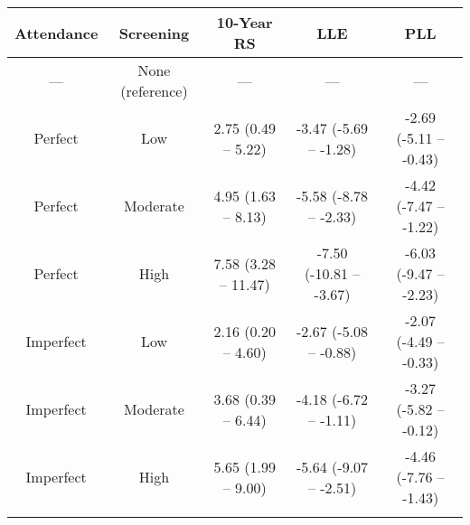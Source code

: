 \begin{tabular}{ccccc}
\toprule{}
Attendance & Screening &  10-Year RS & LLE & PLL \\
\midrule{}
 --- & None (reference) & --- & --- & --- \\
Perfect & Low &  2.75 (0.49 -- 5.22) & -3.47 (-5.69 -- -1.28) & -2.69 (-5.11 -- -0.43)  \\
Perfect & Moderate &  4.95 (1.63 -- 8.13) & -5.58 (-8.78 -- -2.33) & -4.42 (-7.47 -- -1.22)  \\
Perfect & High &  7.58 (3.28 -- 11.47) & -7.50 (-10.81 -- -3.67) & -6.03 (-9.47 -- -2.23)  \\
Imperfect & Low &  2.16 (0.20 -- 4.60) & -2.67 (-5.08 -- -0.88) & -2.07 (-4.49 -- -0.33)  \\
Imperfect & Moderate &  3.68 (0.39 -- 6.44) & -4.18 (-6.72 -- -1.11) & -3.27 (-5.82 -- -0.12)  \\
Imperfect & High &  5.65 (1.99 -- 9.00) & -5.64 (-9.07 -- -2.51) & -4.46 (-7.76 -- -1.43)  \\
\bottomrule{}
\end{tabular}